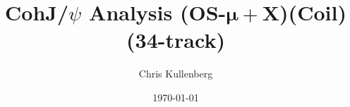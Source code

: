 \title{CohJ/$\psi$ Analysis (\textbf{OS}-$\boldsymbol{\mu+}$\textbf{X})(\textbf{Coil})(\textbf{34-track})}
\author{Chris Kullenberg}
\date{\today}
